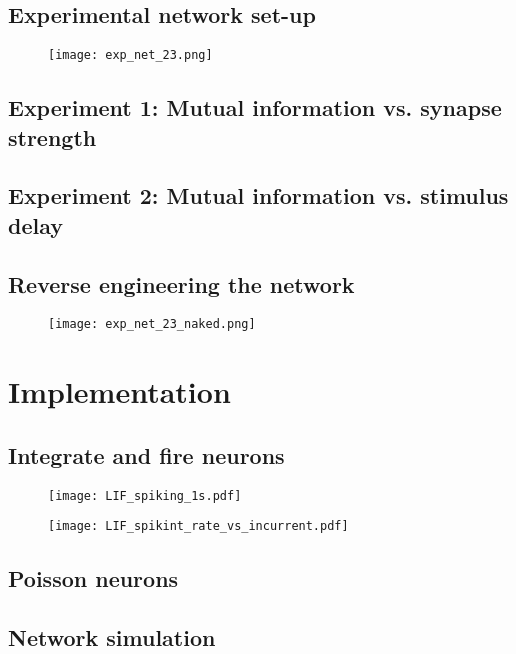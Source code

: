 \documentclass[12pt]{extarticle}
\begin{document}
\subsection{Experimental network set-up}
\begin{figure}[H]
	\centering
	\texttt{[image: exp\_net\_23.png]}
    \caption{}
\end{figure}

\subsection{Experiment 1: Mutual information vs. synapse strength}

\subsection{Experiment 2: Mutual information vs. stimulus delay}

\subsection{Reverse engineering the network}
\begin{figure}[H]
	\centering
	\texttt{[image: exp\_net\_23\_naked.png]}
    \caption{}
\end{figure}




\newpage
\section{Implementation}
\subsection{Integrate and fire neurons}
\begin{figure}[H]
	\centering
	\texttt{[image: LIF\_spiking\_1s.pdf]}
    \caption{}
\end{figure}

\begin{figure}[H]
	\centering
	\texttt{[image: LIF\_spikint\_rate\_vs\_incurrent.pdf]}
    \caption{}
\end{figure}

\subsection{Poisson neurons}

\subsection{Network simulation}
\end{document}
